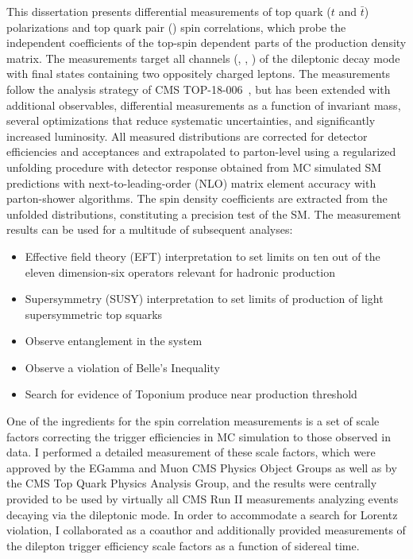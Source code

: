 This dissertation presents differential measurements of top quark ($t$ and $\bar{t}$) polarizations and top quark pair (\ttbar) spin correlations, which probe the independent coefficients of the top-spin dependent parts of the \ttbar production density matrix.
The measurements target all channels (\ee, \emu, \mumu) of the \ttbar dileptonic decay mode with final states containing two oppositely charged leptons.
The measurements follow the analysis strategy of CMS TOP-18-006~\cite{Sirunyan:2681777}, but has been extended with additional observables, differential measurements as a function of \ttbar invariant mass, several optimizations that reduce systematic uncertainties, and significantly increased luminosity.
All measured distributions are corrected for detector efficiencies and acceptances and extrapolated to parton-level using a regularized unfolding procedure with detector response obtained from MC simulated SM predictions with next-to-leading-order (NLO) matrix element accuracy with parton-shower algorithms.
The spin density coefficients are extracted from the unfolded distributions, constituting a precision test of the SM.
The measurement results can be used for a multitude of subsequent analyses:
\begin{itemize}
    \item Effective field theory (EFT) interpretation to set limits on ten out of the eleven dimension-six operators relevant for hadronic \ttbar production~\cite{Sirunyan:2681777}
    \item Supersymmetry (SUSY) interpretation to set limits of production of light supersymmetric top squarks~\cite{CMS-PAS-FTR-18-034}
    \item Observe entanglement in the \ttbar system~\cite{Afik_2021}
    \item Observe a violation of Belle's Inequality~\cite{Aguilar_Saavedra_2022}
    \item Search for evidence of Toponium produce near \ttbar production threshold~\cite{PhysRevD.104.034023}
\end{itemize}

One of the ingredients for the \ttbar spin correlation measurements is a set of scale factors correcting the trigger efficiencies in MC simulation to those observed in data.
I performed a detailed measurement of these scale factors, which were approved by the EGamma and Muon CMS Physics Object Groups as well as by the CMS Top Quark Physics Analysis Group, and the results were centrally provided to be used by virtually all CMS Run II measurements analyzing \ttbar events decaying via the dileptonic mode.
In order to accommodate a search for Lorentz violation, I collaborated as a coauthor and additionally provided measurements of the dilepton trigger efficiency scale factors as a function of sidereal time.

